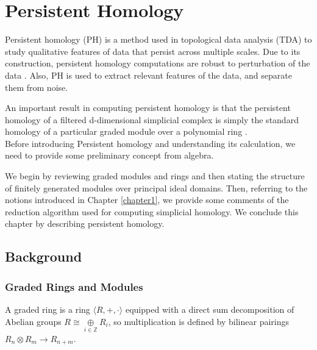 \documentclass[11pt,a4paper]{report}
\begin{document}
\begin{Ex}
              \end{Ex}


             \chapter{Persistent Homology}

                Persistent homology (PH) is a method used in topological data analysis (TDA) to study
                qualitative features of data that persist across multiple scales. Due to its construction, persistent homology computations are
                robust to perturbation of the data \cite{Otter_Porter_Tillmann_Grindrod_Harrington_2017}. Also, PH is used to extract relevant features of the data, and separate them from noise. 

                An important result in computing persistent homology is that the persistent homology of a filtered d-dimensional simplicial
                complex is simply the standard homology of a particular graded module over a polynomial ring \cite{Zomorodian_Carlsson_2005}.\\
                Before introducing Persistent homology and understanding its calculation, we need to provide some preliminary concept from algebra.

                We begin by reviewing graded modules and rings and then stating the structure of finitely generated modules over principal
                ideal domains. Then, referring to the notions introduced in Chapter \ref{chapter1}, we provide some
                comments of the reduction algorithm used for computing simplicial homology. We conclude this chapter by describing persistent
                homology.


                \section{Background}
              \subsection{Graded Rings and Modules}

              A graded ring is a ring $\langle R, +, \cdot \rangle$ equipped with a direct sum decomposition of Abelian
              groups $R \cong \underset{i \in \mathbb{Z}}{\oplus} R_i$, so multiplication is defined by bilinear pairings $R_n \otimes R_m \rightarrow R_{n+m}$. \\
\end{document}
